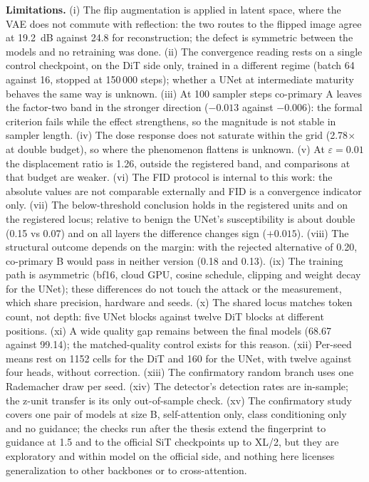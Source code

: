 \documentclass{article}
\begin{document}
\textbf{Limitations.} (i) The flip augmentation is applied in latent space, where the VAE does not commute with reflection: the two routes to the flipped image agree at 19.2~dB against 24.8 for reconstruction; the defect is symmetric between the models and no retraining was done. (ii) The convergence reading rests on a single control checkpoint, on the DiT side only, trained in a different regime (batch 64 against 16, stopped at 150\,000 steps); whether a UNet at intermediate maturity behaves the same way is unknown. (iii) At 100 sampler steps co-primary A leaves the factor-two band in the stronger direction ($-0.013$ against $-0.006$): the formal criterion fails while the effect strengthens, so the magnitude is not stable in sampler length. (iv) The dose response does not saturate within the grid (2.78$\times$ at double budget), so where the phenomenon flattens is unknown. (v) At $\varepsilon{=}0.01$ the displacement ratio is 1.26, outside the registered band, and comparisons at that budget are weaker. (vi) The FID protocol is internal to this work: the absolute values are not comparable externally and FID is a convergence indicator only. (vii) The below-threshold conclusion holds in the registered units and on the registered locus; relative to benign the UNet's susceptibility is about double (0.15 vs 0.07) and on all layers the difference changes sign ($+0.015$). (viii) The structural outcome depends on the margin: with the rejected alternative of 0.20, co-primary B would pass in neither version (0.18 and 0.13). (ix) The training path is asymmetric (bf16, cloud GPU, cosine schedule, clipping and weight decay for the UNet); these differences do not touch the attack or the measurement, which share precision, hardware and seeds. (x) The shared locus matches token count, not depth: five UNet blocks against twelve DiT blocks at different positions. (xi) A wide quality gap remains between the final models (68.67 against 99.14); the matched-quality control exists for this reason. (xii) Per-seed means rest on 1152 cells for the DiT and 160 for the UNet, with twelve against four heads, without correction. (xiii) The confirmatory random branch uses one Rademacher draw per seed. (xiv) The detector's detection rates are in-sample; the z-unit transfer is its only out-of-sample check. (xv) The confirmatory study covers one pair of models at size B, self-attention only, class conditioning only and no guidance; the checks run after the thesis extend the fingerprint to guidance at 1.5 and to the official SiT checkpoints up to XL/2, but they are exploratory and within model on the official side, and nothing here licenses generalization to other backbones or to cross-attention.
\end{document}
